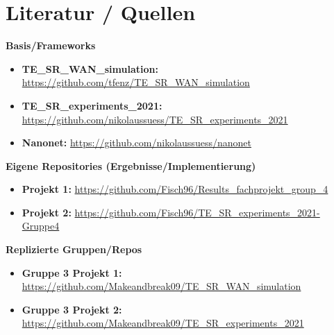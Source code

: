 \documentclass[sigconf,nonacm,review]{acmart}
\begin{document}
\clearpage
\onecolumn
\section*{Literatur / Quellen}
\textbf{Basis/Frameworks}\\
\begin{itemize}
  \item \textbf{TE\_SR\_WAN\_simulation:} \url{https://github.com/tfenz/TE_SR_WAN_simulation}
  \item \textbf{TE\_SR\_experiments\_2021:} \url{https://github.com/nikolaussuess/TE_SR_experiments_2021}
  \item \textbf{Nanonet:} \url{https://github.com/nikolaussuess/nanonet}
\end{itemize}
\medskip
\textbf{Eigene Repositories (Ergebnisse/Implementierung)}\\
\begin{itemize}
  \item \textbf{Projekt 1:} \url{https://github.com/Fisch96/Results_fachprojekt_group_4}
  \item \textbf{Projekt 2:} \url{https://github.com/Fisch96/TE_SR_experiments_2021-Gruppe4}
\end{itemize}
\medskip
\textbf{Replizierte Gruppen/Repos}\\
\begin{itemize}
  \item \textbf{Gruppe 3 Projekt 1:} \url{https://github.com/Makeandbreak09/TE_SR_WAN_simulation}
  \item \textbf{Gruppe 3 Projekt 2:} \url{https://github.com/Makeandbreak09/TE_SR_experiments_2021}
\end{itemize}
\end{document}
